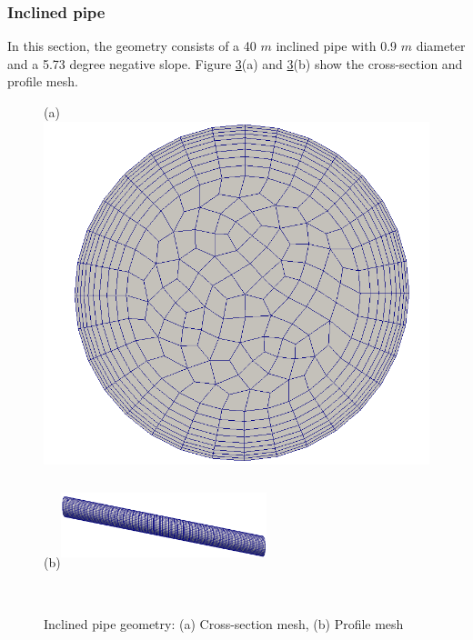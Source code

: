\documentclass[review,3p,times,12pt]{elsarticle}
\begin{document}
\subsubsection{Inclined pipe}\label{inclined}
In this section, the geometry consists of a 40 $m$ inclined pipe with 0.9 $m$ diameter and a 5.73 degree negative slope. Figure \ref{incline}(a) and \ref{incline}(b) show the
cross-section and profile mesh.\\
\begin{minipage}[t]{0.35\textwidth}
\begin{figure}[H]
\begin{center}
(a)\includegraphics[scale =0.09]{figs/section.png}
\label{fig:gauss}
\end{center}
\end{figure}
\end{minipage}\hfill
\begin{minipage}[t]{0.4\textwidth}
\begin{figure}[H]
(b)\includegraphics[width=6cm,height=2.5cm]{figs/IP}
\label{fig:gauss}
\end{figure}
\end{minipage}\\
\begin{figure}[H]
\centering
\caption{Inclined pipe geometry: (a) Cross-section mesh, (b) Profile mesh }
\label{incline}
\end{figure}
\end{document}
